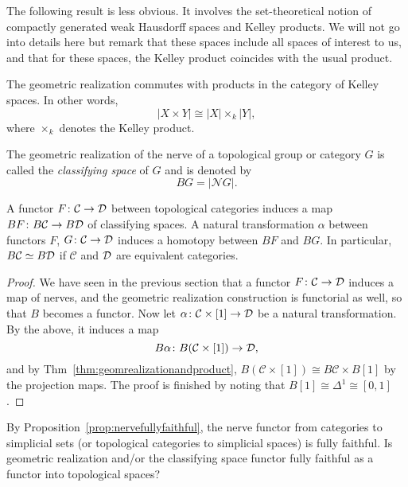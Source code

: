 \documentclass[a4paper,openany]{scrbook}
\renewcommand{\C}{\mathcal C}
\newcommand{\nerve}{\mathcal N}
\begin{document}
The following result is less obvious. It involves the set-theoretical notion of compactly generated weak Hausdorff spaces and Kelley products. We will not go into details here but remark that these spaces include all spaces of interest to us, and that for these spaces, the Kelley product coincides with the usual product. 
\begin{thm} \label{thm:geomrealizationandproduct}
The geometric realization commutes with products in the category of Kelley spaces. In other words,
\[
| X \times Y | \cong |X| \times_k |Y|,
\]
where $\times_k$ denotes the Kelley product.
\end{thm}

\begin{defn}
The geometric realization of the nerve of a topological group or category $G$ is called the \emph{classifying space} of $G$ and is denoted by
\[
BG = |\nerve G|.
\]
\end{defn}



\begin{lemma}\label{lemma:classifyinghomotopy}
A functor $F\colon \C \to \D$ between topological categories induces a map $BF\colon B\C \to B\D$ of classifying spaces. A natural transformation $\alpha$ between functors $F$, $G\colon \C \to \D$ induces a homotopy between $BF$ and $BG$. In particular, $B\C \simeq B\D$ if $\C$ and $\mathcal D$ are equivalent categories.
\end{lemma}
\begin{proof}
We have seen in the previous section that a functor $F\colon \C \to \D$ induces a map of nerves, and the geometric realization construction is functorial as well, so that $B$ becomes a functor. Now let $\alpha\colon \C \times [1] \to \D$ be a natural transformation. By the above, it induces a map
\[
B\alpha\colon B(\C \times [1]) \to \D,
\]
and by Thm~\ref{thm:geomrealizationandproduct}, $B(\C \times [1]) \cong B\C \times B[1]$ by the projection maps. The proof is finished by noting that $B[1] \cong \Delta^1 \cong [0,1]$.
\end{proof}

\begin{exer}
By Proposition~\ref{prop:nervefullyfaithful}, the nerve functor from categories to simplicial sets (or topological categories to simplicial spaces) is fully faithful. Is geometric realization and/or the classifying space functor fully faithful as a functor into topological spaces?
\end{exer}
\end{document}
